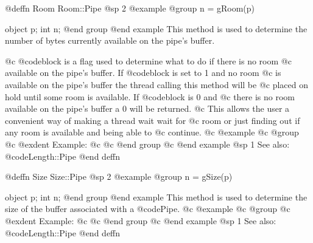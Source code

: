 @deffn {Room} Room::Pipe
@sp 2
@example
@group
n = gRoom(p)

object  p;
int     n;
@end group
@end example
This method is used to determine the number of bytes currently available
on the pipe's buffer.

@c @code{block} is a flag used to determine what to do if there is no room
@c available on the pipe's buffer.  If @code{block} is set to 1 and no room
@c is available on the pipe's buffer the thread calling this method will be
@c placed on hold until some room is available.  If @code{block} is 0 and
@c there is no room available on the pipe's buffer a 0 will be returned.
@c This allows the user a convenient way of making a thread wait wait for
@c room or just finding out if any room is available and being able to
@c continue.
@c @example
@c @group
@c @exdent Example:
@c 
@c @end group
@c @end example
@sp 1
See also:  @code{Length::Pipe}
@end deffn












@deffn {Size} Size::Pipe
@sp 2
@example
@group
n = gSize(p)

object  p;
int     n;
@end group
@end example
This method is used to determine the size of the buffer associated with a
@code{Pipe}.
@c @example
@c @group
@c @exdent Example:
@c 
@c @end group
@c @end example
@sp 1
See also:  @code{Length::Pipe}
@end deffn
















